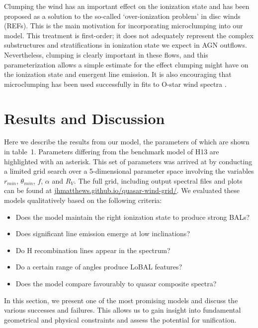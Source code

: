 \documentclass[useAMS,usenatbib]{mn2e_x}
\begin{document}
Clumping the wind has an important effect on the ionization state and has
been proposed as a solution to the so-called `over-ionization problem' in 
disc winds (REFs). This is the main motivation for incorporating microclumping
into our model. This treatment is first-order; it does not adequately
represent the complex substructures and stratifications in ionization
state we expect in AGN outflows. Nevertheless, clumping is clearly
important in these flows, and this parameterization allows a simple estimate
for the effect clumping might have on the ionization state and emergent 
line emission. It is also encouraging that microclumping has been used 
successfully in fits to O-star wind spectra \citep{hillier1991eswingsmodel}.











\section{Results and Discussion}

Here we describe the results from our model, the parameters
of which are shown in table~1.
Parameters differing from the benchmark model of
H13 are highlighted with an asterisk.
This set of parameters
was arrived at by conducting a limited grid search over a 
5-dimensional parameter space involving the variables
$r_{min}$, $\theta_{min}$, $f$, $\alpha$ and $R_V$.
The full grid, including output spectral files and plots can be found at
\url{jhmatthews.github.io/quasar-wind-grid/}.
We evaluated these models qualitatively based on the following
criteria:
\begin{itemize}
\item Does the model maintain the right ionization state to produce strong BALs?
\item Does significant line emission emerge at low inclinations?
\item Do H recombination lines appear in the spectrum?
\item Do a certain range of angles produce LoBAL features?
\item Does the model compare favourably to quasar composite spectra?
\end{itemize}
In this section, we present one of the most promising models and discuss
the various successes and failures.
This allows us to gain insight into fundamental geometrical 
and physical constraints and assess the potential for unification. 
\end{document}
